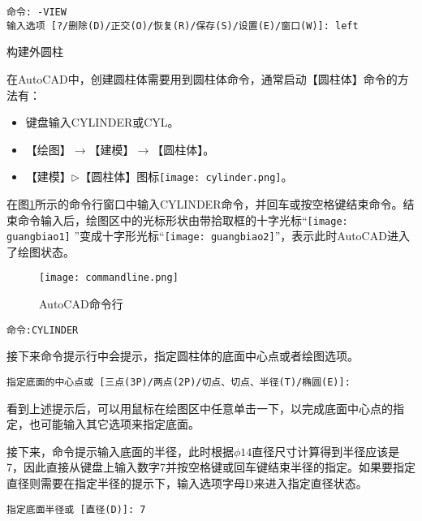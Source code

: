 \begin{procedure}
\begin{lstlisting}
命令: -VIEW
输入选项 [?/删除(D)/正交(O)/恢复(R)/保存(S)/设置(E)/窗口(W)]: left
\end{lstlisting}


\item 构建外圆柱

在AutoCAD中，创建圆柱体需要用到圆柱体命令，通常启动【圆柱体】命令的方法有：
\begin{itemize}
\item 键盘输入CYLINDER或CYL。
\item 【绘图】$\rightarrow$【建模】$\rightarrow$【圆柱体】。
\item 【建模】$\triangleright$【圆柱体】图标\texttt{[image: cylinder.png]}。
\end{itemize}

在图\ref{fig:commandline}所示的命令行窗口中输入CYLINDER命令，并回车或按空格键结束命令。结束命令输入后，绘图区中的光标形状由带拾取框的十字光标“\texttt{[image: guangbiao1]} ”变成十字形光标“\texttt{[image: guangbiao2]}”，表示此时AutoCAD进入了绘图状态。
\begin{figure}[htbp]
\centering
\texttt{[image: commandline.png]}
\caption{AutoCAD命令行}\label{fig:commandline}
\end{figure}

\begin{lstlisting}
命令:CYLINDER
\end{lstlisting}

接下来命令提示行中会提示，指定圆柱体的底面中心点或者绘图选项。
\begin{lstlisting}
指定底面的中心点或 [三点(3P)/两点(2P)/切点、切点、半径(T)/椭圆(E)]:
\end{lstlisting}

看到上述提示后，可以用鼠标在绘图区中任意单击一下，以完成底面中心点的指定，也可能输入其它选项来指定底面。

接下来，命令提示输入底面的半径，此时根据$\phi 14$直径尺寸计算得到半径应该是7，因此直接从键盘上输入数字7并按空格键或回车键结束半径的指定。如果要指定直径则需要在指定半径的提示下，输入选项字母D来进入指定直径状态。
\begin{lstlisting}
指定底面半径或 [直径(D)]: 7
\end{lstlisting}


\end{procedure}
